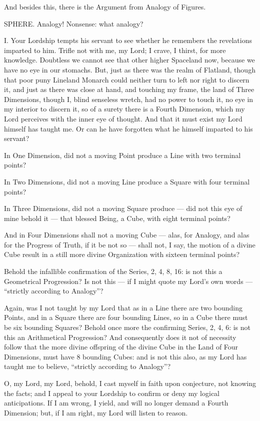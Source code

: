 \documentclass[12pt, a4paper, twoside]{memoir}
\begin{document}
And besides this, there is the Argument from Analogy of Figures.

SPHERE. Analogy! Nonsense: what analogy?

I. Your Lordship tempts his servant to see whether he remembers the
revelations imparted to him. Trifle not with me, my Lord; I crave, I thirst,
for more knowledge. Doubtless we cannot see that other higher Spaceland now,
because we have no eye in our stomachs. But, just as there was the realm of
Flatland, though that poor puny Lineland Monarch could neither turn to left
nor right to discern it, and just as there was close at hand, and touching my
frame, the land of Three Dimensions, though I, blind senseless wretch, had no
power to touch it, no eye in my interior to discern it, so of a surety there
is a Fourth Dimension, which my Lord perceives with the inner eye of thought.
And that it must exist my Lord himself has taught me. Or can he have forgotten
what he himself imparted to his servant?

In One Dimension, did not a moving Point produce a Line with two terminal
points?

In Two Dimensions, did not a moving Line produce a Square with four terminal
points?

In Three Dimensions, did not a moving Square produce --- did not this eye of
mine behold it --- that blessed Being, a Cube, with eight terminal points?

And in Four Dimensions shall not a moving Cube --- alas, for Analogy, and alas
for the Progress of Truth, if it be not so --- shall not, I say, the motion of a
divine Cube result in a still more divine Organization with sixteen terminal
points?

Behold the infallible confirmation of the Series, 2, 4,
8, 16: is not this a Geometrical Progression? Is not this --- if I might quote
my Lord's own words --- ``strictly according to Analogy''?

Again, was I not taught by my Lord that as in a Line there are two bounding
Points, and in a Square there are four bounding Lines, so in a Cube there must
be six bounding Squares? Behold once more the confirming Series, 2, 4, 6: is
not this an Arithmetical Progression? And consequently does it not of
necessity follow that the more divine offspring of the divine Cube in the Land
of Four Dimensions, must have 8 bounding Cubes: and is not this also, as my
Lord has taught me to believe, ``strictly according to Analogy''?

O, my Lord, my Lord, behold, I cast myself in faith upon conjecture, not
knowing the facts; and I appeal to your Lordship to confirm or deny my logical
anticipations. If I am wrong, I yield, and will no longer demand a Fourth
Dimension; but, if I am right, my Lord will listen to reason.
\end{document}
